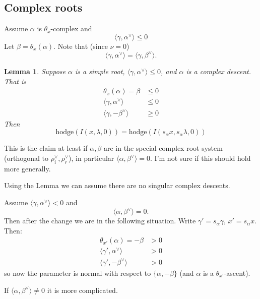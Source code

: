 \documentclass[12pt,leqno]{article}
\newtheorem{lemma}[equation]{Lemma}
\newcommand{\hodge}{\text{hodge}}
\newcommand{\ch}[1]{#1^\vee}
\newcommand{\subsec}[1]{\subsection{#1}
\renewcommand{\theequation}{\thesubsection.\arabic{equation}}}
\begin{document}
\subsec{Complex roots}

Assume $\alpha$ is $\theta_x$-complex
and
$$
\langle \gamma,\ch\alpha\rangle\le 0
$$
Let $\beta=\theta_x(\alpha)$. Note that (since $\nu=0$)
$$
\langle\gamma,\ch\alpha\rangle=\langle\gamma,\ch\beta\rangle.
$$




\begin{lemma}
\label{l:complexdescent}
Suppose $\alpha$ is a simple root, $\langle\gamma,\ch\alpha\rangle\le 0$, and $\alpha$ is a complex descent.
That is
$$
\begin{aligned}
\theta_x(\alpha)=\beta&\le 0\\
\langle\gamma,\ch\alpha\rangle&\le 0\\
\langle\gamma,-\ch\beta\rangle&\ge 0
\end{aligned}
$$
Then
{\normalfont
$$
\hodge(I(x,\lambda,0))=\hodge(I(s_\alpha x,s_\alpha\lambda,0))
$$
}
\end{lemma}

\begin{remarkplain}
This is the claim at least if $\alpha,\beta$ are in the special complex
root system (orthogonal to $\ch\rho_i,\ch\rho_r$), in particular
$\langle\alpha,\ch\beta\rangle=0$. I'm not sure if this should hold more generally.
\end{remarkplain}

\begin{remarkplain}
Using the Lemma we can assume there are no singular complex descents.
\end{remarkplain}

Assume
$\langle\gamma,\ch\alpha\rangle<0$ and
$$
\langle \alpha,\ch\beta\rangle=0.
$$
Then after the change we are in the following situation.
Write $\gamma'=s_\alpha\gamma$, $x'=s_\alpha x$. Then:
$$
\begin{aligned}
\theta_{x'}(\alpha)=-\beta&>0\\
\langle \gamma',\ch\alpha\rangle &>0\\
\langle \gamma',-\ch\beta\rangle &>0
\end{aligned}
$$
so now the parameter is normal with respect to $\{\alpha,-\beta\}$ (and $\alpha$ is a $\theta_{x'}$-ascent).

If $\langle\alpha,\ch\beta\rangle\ne 0$ it is more complicated.

\medskip
\end{document}

